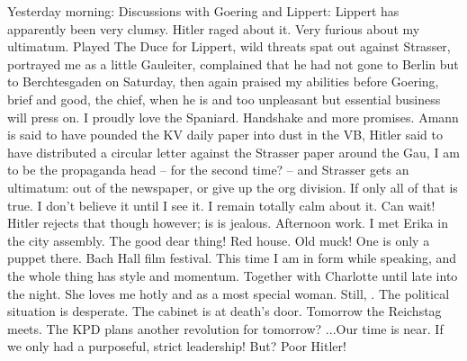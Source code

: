 Yesterday morning: Discussions with Goering and Lippert: Lippert has apparently been very clumsy. Hitler raged about it. Very furious about my ultimatum. Played The Duce for Lippert, wild threats spat out against Strasser, portrayed me as a little Gauleiter, complained that he had not gone to Berlin but to Berchtesgaden on Saturday, then again praised my abilities before Goering, brief and good, the chief, when he is \missing and too unpleasant but essential business will press on. I proudly love the Spaniard. Handshake and more promises.
Amann is said to have pounded the KV daily paper into dust in the VB, Hitler said to have distributed a circular letter against the Strasser paper around the Gau, I am to be the propaganda head -- for the second time? -- and Strasser gets an ultimatum: out of the newspaper, or give up the org division. If only all of that is true. I don't believe it until I see it. I remain totally calm about it. Can wait! Hitler rejects that though however; is is jealous. Afternoon work. I met Erika in the city assembly. The good dear thing! Red house. Old muck! One is only a puppet there. Bach Hall film festival. This time I am in form while speaking, and the whole thing has style and momentum. Together with Charlotte until late into the night. She loves me hotly and as a most special woman. Still, . The political situation is desperate. The cabinet is at death's door. Tomorrow the Reichstag meets.  The KPD plans another revolution for tomorrow? ...Our time is near. If we only had a purposeful, strict leadership! But? Poor Hitler!
